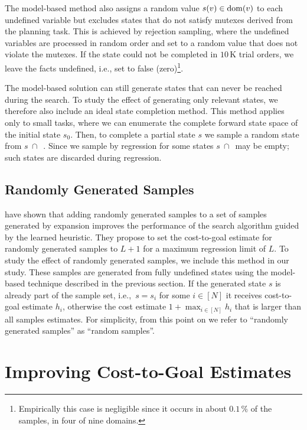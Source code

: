 The model-based method also assigns a random value $s(v)\in\operatorname{dom}(v)$ to each undefined variable but excludes states that do not satisfy mutexes derived from the planning task. This is achieved by rejection sampling, where the undefined variables are processed in random order and set to a random value that does not violate the mutexes. If the state could not be completed in $10$\,K trial orders, we leave the facts undefined, i.e., set to false (zero)\footnote{Empirically this case is negligible since it occurs in about $0.1\,\%$ of the samples, in four of nine domains.}.

The model-based solution can still generate states that can never be reached during the search. To study the effect of generating only relevant states, we therefore also include an ideal state completion method. This method applies only to small tasks, where we can enumerate the complete forward state space \fssp of the initial state $s_0$. Then, to complete a partial state $s$ we sample a random state from $s~\cap$~\fssp. Since we sample by regression for some states $s~\cap$~\fssp may be empty; such states are discarded during regression.

\subsection{Randomly Generated Samples}
\label{sec:random-samples-theory}

\citeyear{OToole/2022} have shown that adding randomly generated samples to a set of samples generated by expansion improves the performance of the search algorithm guided by the learned heuristic. They propose to set the cost-to-goal estimate for randomly generated samples to $L+1$ for a maximum regression limit of $L$. To study the effect of randomly generated samples, we include this method in our study. These samples are generated from fully undefined states using the model-based technique described in the previous section. If the generated state $s$ is already part of the sample set, i.e.,~$s = s_i$ for some $i\in[N]$ it receives cost-to-goal estimate $h_i$, otherwise the cost estimate $1+\max_{i\in[N]} h_i$ that is larger than all samples estimates. For simplicity, from this point on we refer to ``randomly generated samples'' as ``random samples''.

\section{Improving Cost-to-Goal Estimates}
\label{sec:hvalue}

